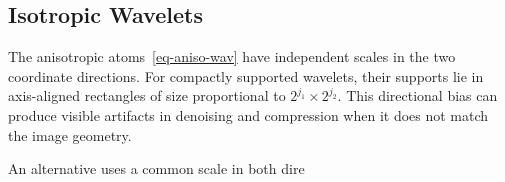                                                    
\subsection{Isotropic Wavelets}\label{sec-isotropic-wav}

The anisotropic atoms~\eqref{eq-aniso-wav} have independent scales in the two coordinate directions. For compactly supported wavelets, their supports lie in axis-aligned rectangles of size proportional to $2^{j_1}\times2^{j_2}$. This directional bias can produce visible artifacts in denoising and compression when it does not match the image geometry.


An alternative uses a common scale in both dire